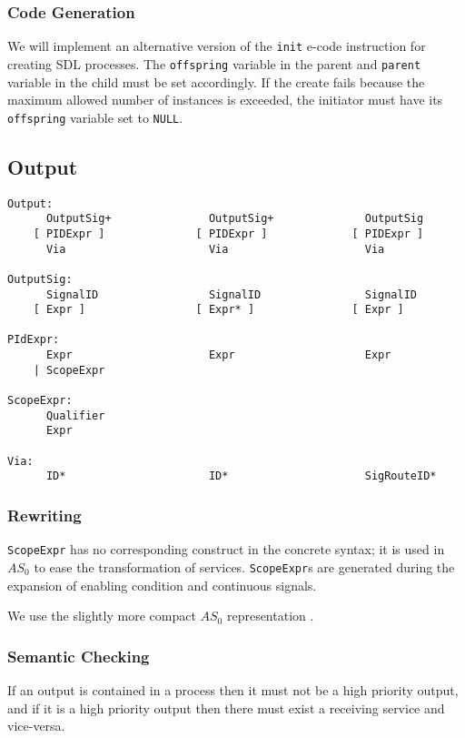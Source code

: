 \subsubsection{Code Generation}

We will implement an alternative version of the {\tt init}
e-code instruction for creating SDL processes.
The {\tt offspring} variable in the parent and {\tt parent} variable
in the child must be set accordingly.
If the create fails because the maximum allowed number of instances
is exceeded, the initiator must have its {\tt offspring} variable set
to {\tt NULL}.

\subsection{Output}

\begin{verbatim}
Output:
      OutputSig+               OutputSig+              OutputSig
    [ PIDExpr ]              [ PIDExpr ]             [ PIDExpr ]
      Via                      Via                     Via

OutputSig:
      SignalID                 SignalID                SignalID
    [ Expr ]                 [ Expr* ]               [ Expr ]

PIdExpr:
      Expr                     Expr                    Expr
    | ScopeExpr

ScopeExpr:
      Qualifier
      Expr

Via:
      ID*                      ID*                     SigRouteID*
\end{verbatim}

\subsubsection{Rewriting}

{\tt ScopeExpr} has no corresponding construct in the concrete
syntax; it is used in $AS_0$ to ease the transformation of services.
{\tt ScopeExpr}s are generated during the expansion of enabling
condition and continuous signals.

We use the slightly more compact $AS_0$ representation .

\subsubsection{Semantic Checking}

If an output is contained in a process then it must not be a
high priority output, and if it is a high priority output then there
must exist a receiving service and vice-versa.

